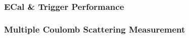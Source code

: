 

\subsubsection{ECal \& Trigger Performance}

\label{sec:ecalperformance}

\subsubsection{Multiple Coulomb Scattering Measurement}
\label{sec:angular_measurement}






